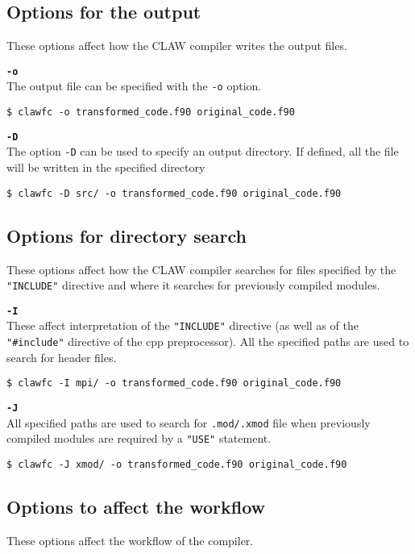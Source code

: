 \documentclass{article}
\begin{document}
\subsection{Options for the output}
These options affect how the CLAW compiler writes the output files.

\textbf{\texttt{-o}}\\
The output file can be specified with the \texttt{-o} option. 
\begin{lstlisting}
$ clawfc -o transformed_code.f90 original_code.f90
\end{lstlisting}

\textbf{\texttt{-D}}\\
The option \texttt{-D} can be used to specify an output directory. If defined, all the file 
will be written in the specified directory

\begin{lstlisting}
$ clawfc -D src/ -o transformed_code.f90 original_code.f90
\end{lstlisting}

\subsection{Options for directory search}
These options affect how the CLAW compiler searches for files specified by the
\texttt{"INCLUDE"} directive and where it searches for previously compiled modules.

\textbf{\texttt{-I}}\\
These affect interpretation of the \texttt{"INCLUDE"} directive (as well as of the \texttt{"\#include"} directive of the cpp preprocessor).
All the specified paths are used to search for header files.
\begin{lstlisting}
$ clawfc -I mpi/ -o transformed_code.f90 original_code.f90
\end{lstlisting}

\textbf{\texttt{-J}}\\
All specified paths are used to search for \texttt{.mod/.xmod} file when previously compiled modules are required by a \texttt{"USE"} statement.
\begin{lstlisting}
$ clawfc -J xmod/ -o transformed_code.f90 original_code.f90
\end{lstlisting}

\subsection{Options to affect the workflow}
These options affect the workflow of the compiler. 
\end{document}
